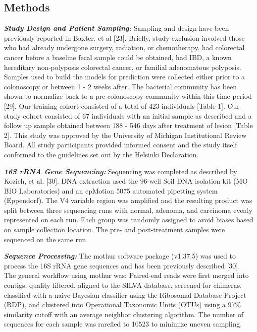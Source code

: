 \documentclass[12pt,]{article}
\begin{document}
\newpage

\subsection{Methods}\label{methods}

\textbf{\emph{Study Design and Patient Sampling:}} Sampling and design
have been previously reported in Baxter, et al {[}23{]}. Briefly, study
exclusion involved those who had already undergone surgery, radiation,
or chemotherapy, had colorectal cancer before a baseline fecal sample
could be obtained, had IBD, a known hereditary non-polyposis colorectal
cancer, or familial adenomatous polyposis. Samples used to build the
models for prediction were collected either prior to a colonoscopy or
between 1 - 2 weeks after. The bacterial community has been shown to
normalize back to a pre-colonoscopy community within this time period
{[}29{]}. Our training cohort consisted of a total of 423 individuals
{[}Table 1{]}. Our study cohort consisted of 67 individuals with an
initial sample as described and a follow up sample obtained between 188
- 546 days after treatment of lesion {[}Table 2{]}. This study was
approved by the University of Michigan Institutional Review Board. All
study participants provided informed consent and the study itself
conformed to the guidelines set out by the Helsinki Declaration.

\textbf{\emph{16S rRNA Gene Sequencing:}} Sequencing was completed as
described by Kozich, et al. {[}30{]}. DNA extraction used the 96-well
Soil DNA isolation kit (MO BIO Laboratories) and an epMotion 5075
automated pipetting system (Eppendorf). The V4 variable region was
amplified and the resulting product was split between three sequencing
runs with normal, adenoma, and carcinoma evenly represented on each run.
Each group was randomly assigned to avoid biases based on sample
collection location. The pre- and post-treatment samples were sequenced
on the same run.

\textbf{\emph{Sequence Processing:}} The mothur software package
(v1.37.5) was used to process the 16S rRNA gene sequences and has been
previously described {[}30{]}. The general workflow using mothur was:
Paired-end reads were first merged into contigs, quality filtered,
aligned to the SILVA database, screened for chimeras, classified with a
naive Bayesian classifier using the Ribosomal Database Project (RDP),
and clustered into Operational Taxonomic Units (OTUs) using a 97\%
similarity cutoff with an average neighbor clustering algorithm. The
number of sequences for each sample was rarefied to 10523 to minimize
uneven sampling.
\end{document}

